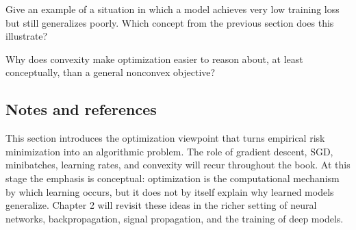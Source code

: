 \begin{exercise}
Give an example of a situation in which a model achieves very low training loss but still generalizes poorly. Which concept from the previous section does this illustrate?
\end{exercise}

\begin{exercise}
Why does convexity make optimization easier to reason about, at least conceptually, than a general nonconvex objective?
\end{exercise}

\subsection*{Notes and references}

This section introduces the optimization viewpoint that turns empirical risk minimization into an algorithmic problem. The role of gradient descent, SGD, minibatches, learning rates, and convexity will recur throughout the book. At this stage the emphasis is conceptual: optimization is the computational mechanism by which learning occurs, but it does not by itself explain why learned models generalize. Chapter 2 will revisit these ideas in the richer setting of neural networks, backpropagation, signal propagation, and the training of deep models.